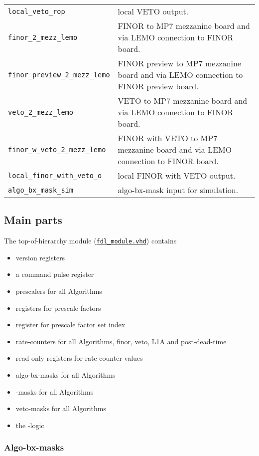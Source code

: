 \begin{table}
\begin{tabular}{l p{}}
\verb|local_veto_rop| & local VETO output.\\
\verb|finor_2_mezz_lemo| & FINOR to MP7 mezzanine board and via LEMO connection to FINOR board.\\
\verb|finor_preview_2_mezz_lemo| & FINOR preview to MP7 mezzanine board and via LEMO connection to FINOR preview board.\\
\verb|veto_2_mezz_lemo| & VETO to MP7 mezzanine board and via LEMO connection to FINOR board.\\
\verb|finor_w_veto_2_mezz_lemo| & FINOR with VETO to MP7 mezzanine board and via LEMO connection to FINOR board.\\
\verb|local_finor_with_veto_o| & local FINOR with VETO output.\\
\verb|algo_bx_mask_sim| & algo-bx-mask input for simulation.\\
\bottomrule
\end{tabular}
\label{tab:fdl:explanation_fdl_module_vhd}
\end{table}

\clearpage

\subsection{Main parts}

The top-of-hierarchy module (\href{\gitbranch/firmware/hdl/payload/fdl_module.vhd}{\texttt{\textquotesingle fdl\_module.vhd\textquotesingle }}) contains
\begin {itemize}
\item version registers
\item a command pulse register
\item prescalers for all Algorithms
\item registers for prescale factors
\item register for prescale factor set index
\item rate-counters for all Algorithms, finor, veto, L1A and post-dead-time
\item read only registers for rate-counter values
\item algo-bx-masks for all Algorithms
\item \finor-masks for all Algorithms
\item veto-masks for all Algorithms
\item the \finor-logic
\end {itemize}

\subsubsection{Algo-bx-masks}
\label{sec:fdl:algo_bx_masks}

